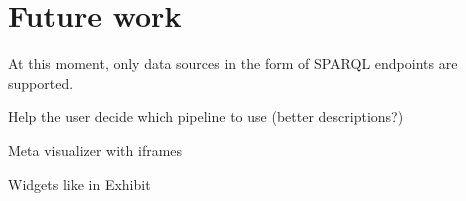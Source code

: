 \chapter{Future work}

At this moment, only data sources in the form of SPARQL endpoints are supported.

Help the user decide which pipeline to use (better descriptions?)

Meta visualizer with iframes

Widgets like in Exhibit